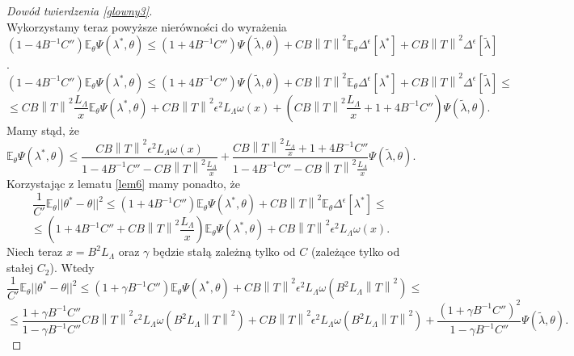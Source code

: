 \documentclass{mwart}
\newcommand{\norm}[1]{\left\lVert#1\right\rVert}
\begin{document}
\begin{proof}[Dowód twierdzenia \ref{glowny3}]
\begin{displaymath}
\end{displaymath}
Wykorzystamy teraz powyższe nierówności do wyrażenia $(1-4B^{-1}C'')\mathbb{E}_{\theta}\Psi(\lambda^*,\theta)\leq (1+4B^{-1}C'')\Psi(\tilde{\lambda},\theta)+CB\norm{T}^2\mathbb{E}_{\theta}\Delta^{\epsilon}[\lambda^*]+CB\norm{T}^2\Delta^{\epsilon}[\tilde{\lambda}]$.
\begin{displaymath}
(1-4B^{-1}C'')\mathbb{E}_{\theta}\Psi(\lambda^*,\theta)\leq (1+4B^{-1}C'')\Psi(\tilde{\lambda},\theta)+CB\norm{T}^2\mathbb{E}_{\theta}\Delta^{\epsilon}[\lambda^*]+CB\norm{T}^2\Delta^{\epsilon}[\tilde{\lambda}]\leq 
\end{displaymath}
\begin{displaymath}
\leq CB\norm{T}^2\frac{L_{\Lambda}}{x}\mathbb{E}_{\theta}\Psi(\lambda^*,\theta)+CB\norm{T}^2\epsilon^2L_{\Lambda}\omega (x)+\left(CB\norm{T}^2\frac{L_{\Lambda}}{x}+1+4B^{-1}C''\right)\Psi(\tilde{\lambda},\theta).
\end{displaymath}
Mamy stąd, że 
\begin{displaymath}
\mathbb{E}_{\theta}\Psi(\lambda^*,\theta)\leq \frac{CB\norm{T}^2\epsilon^2L_{\Lambda}\omega (x)}{1-4B^{-1}C''-CB\norm{T}^2\frac{L_{\Lambda}}{x}}+\frac{CB\norm{T}^2\frac{L_{\Lambda}}{x}+1+4B^{-1}C''}{1-4B^{-1}C''-CB\norm{T}^2\frac{L_{\Lambda}}{x}}\Psi(\tilde{\lambda},\theta).
\end{displaymath}
Korzystając z lematu \ref{lem6} mamy ponadto, że
\begin{displaymath}
\frac{1}{C'}\mathbb{E}_{\theta}||\theta^*-\theta||^2\leq (1+4B^{-1}C'')\mathbb{E}_{\theta}\Psi(\lambda^*,\theta)+CB\norm{T}^2\mathbb{E}_{\theta}\Delta^{\epsilon}[\lambda^*]\leq
\end{displaymath}
\begin{displaymath}
\leq (1+4B^{-1}C''+CB\norm{T}^2\frac{L_{\Lambda}}{x})\mathbb{E}_{\theta}\Psi(\lambda^*,\theta)+CB\norm{T}^2\epsilon^2L_{\Lambda}\omega (x).
\end{displaymath}
Niech teraz $x=B^2L_{\Lambda}$ oraz $\gamma$ będzie stałą zależną tylko od $C$ (zależące tylko od stałej $C_2$). Wtedy 
\begin{displaymath}
\frac{1}{C'}\mathbb{E}_{\theta}||\theta^*-\theta||^2\leq (1+\gamma B^{-1}C'')\mathbb{E}_{\theta}\Psi(\lambda^*,\theta)+CB\norm{T}^2\epsilon^2L_{\Lambda}\omega (B^2L_{\Lambda}\norm{T}^2)\leq
\end{displaymath}
\begin{displaymath}
\leq \frac{1+\gamma B^{-1}C''}{1-\gamma B^{-1}C''}CB\norm{T}^2\epsilon^2L_{\Lambda}\omega (B^2L_{\Lambda}\norm{T}^2)+CB\norm{T}^2\epsilon^2L_{\Lambda}\omega (B^2L_{\Lambda}\norm{T}^2)+\frac{(1+\gamma B^{-1}C'')^2}{1-\gamma B^{-1}C''}\Psi(\tilde{\lambda},\theta).

\end{displaymath}
\end{proof}
\end{document}
